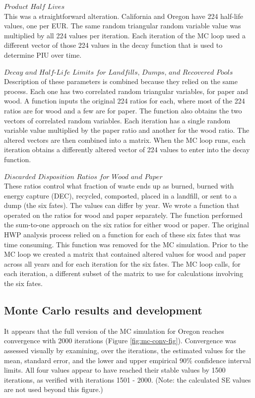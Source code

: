 \documentclass[
  openany]{book}
\begin{document}
\(\textit{Product Half Lives}\)\\
This was a straightforward alteration. California and Oregon have 224 half-life values, one per EUR. The same random triangular random variable value was multiplied by all 224 values per iteration. Each iteration of the MC loop used a different vector of those 224 values in the decay function that is used to determine PIU over time.

\(\textit{Decay and Half-Life Limits for Landfills, Dumps, and Recovered Pools}\)\\
Description of these parameters is combined because they relied on the same process. Each one has two correlated random triangular variables, for paper and wood. A function inputs the original 224 ratios for each, where most of the 224 ratios are for wood and a few are for paper. The function also obtains the two vectors of correlated random variables. Each iteration has a single random variable value multiplied by the paper ratio and another for the wood ratio. The altered vectors are then combined into a matrix. When the MC loop runs, each iteration obtains a differently altered vector of 224 values to enter into the decay function.

\(\textit{Discarded Disposition Ratios for Wood and Paper}\)\\
These ratios control what fraction of waste ends up as burned, burned with energy capture (DEC), recycled, composted, placed in a landfill, or sent to a dump (the six fates). The values can differ by year. We wrote a function that operated on the ratios for wood and paper separately. The function performed the sum-to-one approach on the six ratios for either wood or paper. The original HWP analysis process relied on a function for each of these six fates that was time consuming. This function was removed for the MC simulation. Prior to the MC loop we created a matrix that contained altered values for wood and paper across all years and for each iteration for the six fates. The MC loop calls, for each iteration, a different subset of the matrix to use for calculations involving the six fates.

\hypertarget{model-mc-res}{%
\subsection{Monte Carlo results and development}\label{model-mc-res}}

It appears that the full version of the MC simulation for Oregon reaches convergence with 2000 iterations (Figure \ref{fig:mc-conv-fig}). Convergence was assessed visually by examining, over the iterations, the estimated values for the mean, standard error, and the lower and upper empirical 90\% confidence interval limits. All four values appear to have reached their stable values by 1500 iterations, as verified with iterations 1501 - 2000. (Note: the calculated SE values are not used beyond this figure.)
\end{document}
